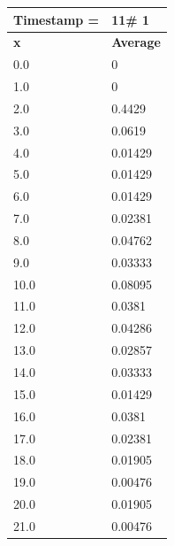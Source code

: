 \begin{tabular}{|l||l|}
\hline
\textbf{Timestamp =} & \textbf{11}\# 1\\\hline
	\textbf{x} & \textbf{Average} \\ \hline
\hline
	0.0 & 0 \\ \hline
	1.0 & 0 \\ \hline
	2.0 & 0.4429 \\ \hline
	3.0 & 0.0619 \\ \hline
	4.0 & 0.01429 \\ \hline
	5.0 & 0.01429 \\ \hline
	6.0 & 0.01429 \\ \hline
	7.0 & 0.02381 \\ \hline
	8.0 & 0.04762 \\ \hline
	9.0 & 0.03333 \\ \hline
	10.0 & 0.08095 \\ \hline
	11.0 & 0.0381 \\ \hline
	12.0 & 0.04286 \\ \hline
	13.0 & 0.02857 \\ \hline
	14.0 & 0.03333 \\ \hline
	15.0 & 0.01429 \\ \hline
	16.0 & 0.0381 \\ \hline
	17.0 & 0.02381 \\ \hline
	18.0 & 0.01905 \\ \hline
	19.0 & 0.00476 \\ \hline
	20.0 & 0.01905 \\ \hline
	21.0 & 0.00476 \\ \hline
\end{tabular}

